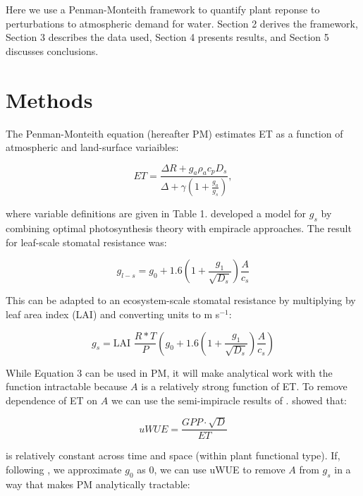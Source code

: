 \documentclass[draft,linenumbers]{agujournal}
\begin{document}
Here we use a Penman-Monteith framework to quantify plant reponse to perturbations to atmospheric demand for water. Section 2 derives the framework, Section 3 describes the data used, Section 4 presents results, and Section 5 discusses conclusions.

\section{Methods}

The Penman-Monteith equation (hereafter PM) estimates ET as a function of atmospheric and land-surface variaibles:

\begin{linenomath*}
  \begin{equation}
      ET = \frac{\Delta R + g_a \rho_a c_p D_{s}}{\Delta + \gamma(1 + \frac{g_a}{g_s})},
  \end{equation}
\end{linenomath*}

 where variable definitions are given in Table 1. \cite{MEDLYN_2011} developed a model for $g_s$ by combining optimal photosynthesis theory with empiracle approaches. The result for leaf-scale stomatal resistance was:

\begin{linenomath*}
  \begin{equation}
  g_{l-s} = g_0 + 1.6 \left(1 + \frac{g_1}{\sqrt{D_{s}}}\right) \frac{A}{c_s}
  \end{equation}
\end{linenomath*}

This can be adapted to an ecosystem-scale stomatal resistance by multiplying by leaf area index (LAI) and converting units to m s$^{-1}$:
\begin{linenomath*}
  \begin{equation}
  g_s = \text{LAI } \frac{R* T}{P} \left( g_0 + 1.6 \left(1 + \frac{g_1}{\sqrt{D_{s}}}\right) \frac{A}{c_s}\right)
  \end{equation}
\end{linenomath*}

While Equation 3 can be used in PM, it will make analytical work with the function intractable because $A$ is a relatively strong function of ET. To remove dependence of ET on $A$ we can use the semi-impiracle results of \cite{Zhou_2015}. \cite{Zhou_2015} showed that:

\begin{linenomath*}
  \begin{equation}
uWUE = \frac{GPP \cdot \sqrt{D}}{ET}
  \end{equation}
\end{linenomath*}
is relatively constant across time and space (within plant functional type). If, following \cite{Lin_2015}, we approximate $g_0$ as $0$, we can use uWUE to remove $A$ from $g_s$ in a way that makes PM analytically tractable:
\end{document}
